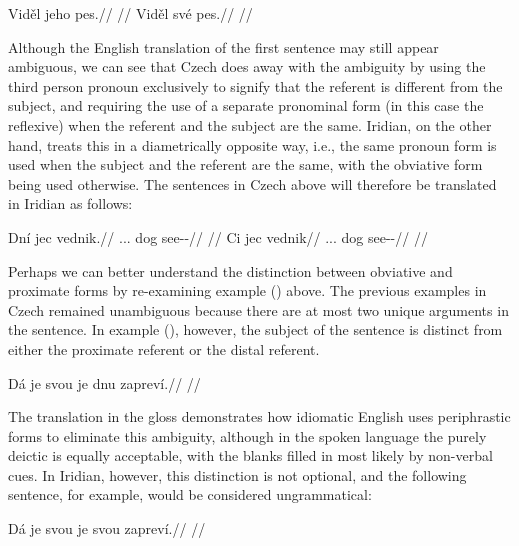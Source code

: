 \begin{multicols}{2}
  \pex
  \a
  \begingl
  \gla Viděl jeho pes.//
  \glft {}//
  \endgl
  \a \begingl
  \gla Viděl své pes.//
  \glft {}//
  \endgl
  \xe
\end{multicols}

Although the English translation of the first sentence may still appear
ambiguous, we can see that Czech does away with the ambiguity by using the third
person pronoun  exclusively to signify that the referent is different
from the subject, and requiring the use of a separate pronominal form (in this
case the reflexive) when the referent and the subject are the same. Iridian, on
the other hand, treats this in a diametrically opposite way, i.e., the same
pronoun form is used when the subject and the referent are the same, with the
obviative form being used otherwise. The sentences in Czech above will therefore
be translated in Iridian as follows:

\pex
\a
\begingl
\gla Dní jec vednik.//
\glb \Dem{}.\Dist{}.\Anim{}.\Gen{} dog see-\Pv{}-\Pf{}//
\glft {}//
\endgl
\a \begingl
\gla Ci jec vednik//
\glb \Dem{}.\Prox{}.\Anim{}.\Gen{} dog see-\Pv{}-\Pf{}//
\glft {}//
\endgl
\xe

Perhaps we can better understand the distinction between obviative and proximate
forms by re-examining example () above. The previous
examples in Czech remained unambiguous because there are at most two unique
arguments in the sentence. In example (), however, the
subject of the sentence is distinct from either the proximate referent or the
distal referent.

\ex[exno={\getfullref{obv.obv1}}]
\begingl
\gla Dá je svou je dnu zapreví.//
\glft {}//
\endgl
\xe

The translation in the gloss demonstrates how idiomatic English uses
periphrastic forms to eliminate this ambiguity, although in the spoken language
the purely deictic  is equally
acceptable, with the blanks filled in most likely by non-verbal cues. In
Iridian, however, this distinction is not optional, and the following sentence,
for example, would be considered ungrammatical:

\ex
\begingl
\gla *Dá je svou je svou zapreví.//
\glft {}//
\endgl
\xe

